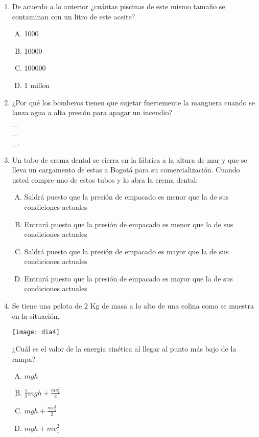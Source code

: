 \begin{enumerate}

\newpage
\item De acuerdo a lo anterior ¿cuántas piscinas de este mismo tamaño se contaminan con un litro de este aceite? \label{dia-12}

\begin{enumerate}[(A)]
\item 1000
\item 10000
\item 100000
\item 1 millon
\end{enumerate}

\item ¿Por qué los bomberos tienen que sujetar fuertemente la manguera cuando se lanza agua a alta presión para apagar un incendio? \label{dia-13} \hrulefill\\
\_\hrulefill\\
\_\hrulefill\\
\_\hrulefill.


\item Un tubo de crema dental se cierra en la fábrica a la altura de mar y que se lleva un cargamento de estas a Bogotá para su comercialización. Cuando usted compre uno de estos tubos y lo abra la crema dental:\label{dia-14}

\begin{enumerate}[(A)]
\item Saldrá puesto que la presión de empacado es menor que la de sus condiciones actuales
\item Entrará puesto que la presión de empacado es menor que la de sus condiciones actuales
\item Saldrá puesto que la presión de empacado es mayor que la de sus condiciones actuales
\item Entrará puesto que la presión de empacado es mayor que la de sus condiciones actuales
\end{enumerate}

\newpage
\item Se tiene una pelota de $2$ Kg de masa a lo alto de una colina como se muestra en la situación.\label{dia-15}

\texttt{[image: dia4]}

 ¿Cuál es el valor de la energía cinética al llegar al punto más bajo de la rampa? 

\begin{enumerate}[(A)]
\item $mgh$
\item $\frac{1}{2}mgh+\frac{mv_1^2}{2}$
\item $mgh+\frac{mv_1^2}{2}$
\item $mgh+mv_1^2$
\end{enumerate}


\end{enumerate}
